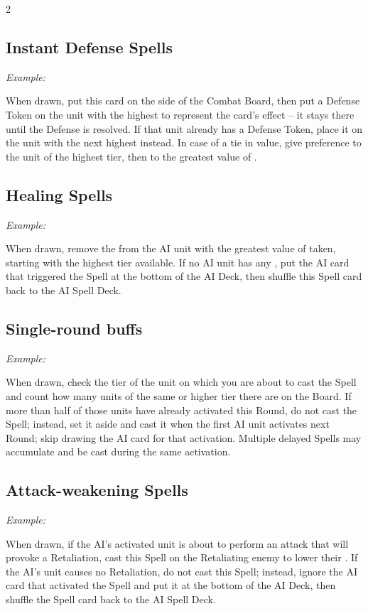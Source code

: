 \begin{multicols*}{2}
  \subsection*{Instant Defense Spells}
  \textit{Example: }

  When drawn, put this card on the side of the Combat Board, then put a Defense Token on the unit with the highest  to represent the card's effect -- it stays there until the Defense is resolved.
  If that unit already has a Defense Token, place it on the unit with the next highest  instead.
  In case of a tie in  value, give preference to the unit of the highest tier, then to the greatest value of .

  \subsection*{Healing Spells}
  \textit{Example: }

  When drawn, remove the  from the AI unit with the greatest value of  taken, starting with the highest tier available.
  If no AI unit has any , put the AI  card that triggered the Spell at the bottom of the AI Deck, then shuffle this Spell card back to the AI Spell Deck.

  \subsection*{Single-round buffs}
  \textit{Example: }

  When drawn, check the tier of the unit on which you are about to cast the Spell and count how many units of the same or higher tier there are on the Board.
  If more than half of those units have already activated this Round, do not cast the Spell; instead, set it aside and cast it when the first AI unit activates next Round; skip drawing the AI card for that activation.
  Multiple delayed Spells may accumulate and be cast during the same activation.

  \subsection*{Attack-weakening Spells}
  \textit{Example: }

  When drawn, if the AI's activated unit is about to perform an attack that will provoke a Retaliation, cast this Spell on the Retaliating enemy to lower their .
  If the AI's unit causes no Retaliation, do not cast this Spell; instead, ignore the AI  card that activated the Spell and put it at the bottom of the AI Deck, then shuffle the Spell card back to the AI Spell Deck.
\end{multicols*}

